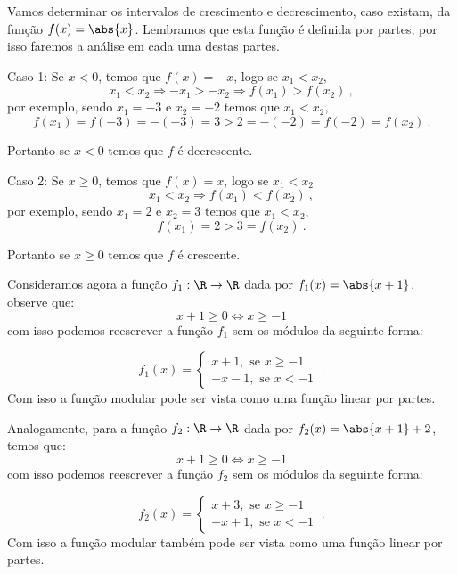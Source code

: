  \begin{exem}
 Vamos determinar os intervalos de crescimento e decrescimento, caso existam, da função $f(x)= \abs{x}$. Lembramos que esta função é definida por partes, por isso faremos a análise em cada uma destas partes.

  Caso 1: Se $x < 0$, temos que $f(x)= -x$, logo se $x_1 < x_2$,
\begin{equation}
x_1 < x_2 \Rightarrow -x_1 > -x_2 \Rightarrow f(x_1) > f(x_2) \ ,
\end{equation}
  por exemplo, sendo $x_1= -3$ e $x_2= -2$ temos que $x_1 < x_2$,
\begin{equation}
f(x_1)= f(-3)= -(-3)= 3 > 2= -(-2)= f(-2)= f(x_2) \ .
\end{equation}

  Portanto se $x < 0$ temos que $f$ é decrescente.

  Caso 2: Se $x \geq 0$, temos que $f(x)= x$, logo se $x_1 < x_2$
\begin{equation}
x_1 < x_2 \Rightarrow  f(x_1) < f(x_2) \ ,
\end{equation}
  por exemplo, sendo $x_1= 2$ e $x_2= 3$ temos que $x_1 < x_2$,
\begin{equation}
f(x_1)= 2 > 3= f(x_2) \ .
\end{equation}

  Portanto se $x \geq 0$ temos que $f$ é crescente.
 \end{exem}

\begin{exem}
  Consideramos agora a função $f_1: \R \rightarrow \R$ dada por $f_1(x)= \abs{x+1}$, observe que:
\begin{equation}
x+1 \geq 0 \Leftrightarrow  x \geq -1
\end{equation}
  com isso podemos reescrever a função $f_1$ sem os módulos da seguinte forma:

  \[f_1(x)= \begin{cases}
                 x + 1, \text{ se } x \geq -1 \\
                 -x - 1, \text{ se } x < -1
                \end{cases} \ .\]
  Com isso a função modular pode ser vista como uma função linear por partes.
\end{exem}

\begin{exem}
  Analogamente, para a função $f_2: \R \rightarrow \R$ dada por $f_2(x)= \abs{x+1}+2$, temos que:
\begin{equation}
x+1 \geq 0 \Leftrightarrow  x \geq -1
\end{equation}
  com isso podemos reescrever a função $f_2$ sem os módulos da seguinte forma:

  \[f_2(x)= \begin{cases}
                 x + 3, \text{ se } x \geq -1 \\
                 -x + 1, \text{ se } x < -1
                \end{cases} \ .\]
  Com isso a função modular também pode ser vista como uma função linear por partes.
\end{exem}

